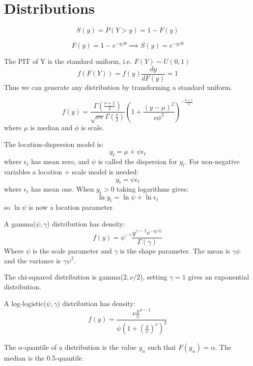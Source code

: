 \documentclass[DIV=14,titlepage=false]{scrreprt}
\begin{document}
\section{Distributions}
\begin{definition}
    \[
        S(y) = P(Y > y) = 1 - F(y)
    \]
\end{definition}
\begin{example}[Exponential]
    \[
        F(y) = 1 - e^{-y/\theta} \implies S(y) = e^{-y/\theta}
    \]
\end{example}
\begin{definition}
The PIT of Y is the standard uniform, i.e. $F(Y) \sim U(0,1)$
\[
    f(F(Y)) = f(y) \frac{dy}{dF(y)} = 1
\]    
Thus we can generate any distribution by transforming a standard uniform.
\end{definition}
\begin{definition}[t-distribution]
    \[
        f(y) = \frac{\Gamma(\frac{\nu+1}{2})}{\sqrt{\nu \pi} \Gamma(\frac{\nu}{2})} \left(1 + \frac{(y-\mu)^2}{\nu \phi^2} \right)^{-\frac{\nu+1}{2}}
    \]    
    where $\mu$ is median and $\phi$ is scale.
\end{definition}
The location-dispersion model is:
\[
    y_t = \mu + \psi \epsilon_t
\]
where $\epsilon_t$ has mean zero, and $\psi$ is called the dispersion for $y_t$. For non-negative variables a location + scale model is needed:
\[
    y_t = \psi \epsilon_t
\]
where $\epsilon_t$ has mean one. When $y_t>0$ taking logarithms gives:
\[
    \ln y_t = \ln \psi + \ln \epsilon_t
\]
so $\ln \psi$ is now a location parameter.
\begin{definition}
    A gamma($\psi, \gamma$) distribution has density:
    \[
        f(y) = \psi^{-\gamma} \frac{y^{\gamma-1}e^{-y/\psi}}{\Gamma(\gamma)}
    \]
    Where $\psi$ is the scale parameter and $\gamma$ is the shape parameter. The mean is $\gamma \psi$ and the variance is $\gamma \psi^2$.
\end{definition}
The chi-squared distribution is gamma($2, \nu/2$), setting $\gamma = 1$ gives an exponential distribution.
\begin{definition}
    A log-logistic($\psi, \gamma$) distribution has density:
    \[
        f(y) = \frac{\nu \frac{y}{\psi}^{\nu-1}}{\psi \left(1 + \left(\frac{y}{\psi}\right)^\nu\right)^2}
    \]
\end{definition}
\begin{definition}[Quantiles]
    The $\alpha$-quantile of a distribution is the value $y_\alpha$ such that $F(y_\alpha) = \alpha$. The median is the 0.5-quantile.
\end{definition}
\end{document}
